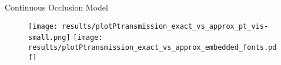 \documentclass[handout,final]{beamer}
\newlength{\onecolwid}
\begin{document}
\begin{frame}[t]
\begin{columns}[t]
\begin{column}{\onecolwid}
\begin{block}{Continuous Occlusion Model}
        \begin{figure}
  		  \usetikzlibrary{calc}
  		  \centering
  		  \begin{tikzpicture}
    			
  		  \end{tikzpicture}  			
  		\end{figure}
        \begin{figure}
          \centering
          \texttt{[image: results/plotPtransmission\_exact\_vs\_approx\_pt\_vis-small.png]}
          \texttt{[image: results/plotPtransmission\_exact\_vs\_approx\_embedded\_fonts.pdf]}          
        \end{figure}
      \end{block}


\end{column}
\end{columns}
\end{frame}
\end{document}
